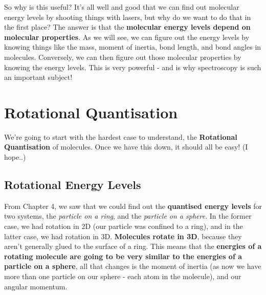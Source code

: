 \documentclass{memoir}[11pt,oneside,a4paper,openany]
\begin{document}
So why is this useful? It's all well and good that we can find out molecular energy levels by shooting things with lasers, but why do we want to do that in the first place? The answer is that the \textbf{molecular energy levels depend on molecular properties}. As we will see, we can figure out the energy levels by knowing things like the mass, moment of inertia, bond length, and bond angles in molecules. Conversely, we can then figure out those molecular properties by knowing the energy levels. This is very powerful - and is why spectroscopy is such an important subject! 

\section{Rotational Quantisation}
We're going to start with the hardest case to understand, the \textbf{Rotational Quantisation} of molecules. Once we have this down, it should all be easy! (I hope..)

\subsection{Rotational Energy Levels}
From Chapter 4, we saw that we could find out the \textbf{quantised energy levels} for two systems, the \emph{particle on a ring}, and the \emph{particle on a sphere}. In the former case, we had rotation in 2D (our particle was confined to a ring), and in the latter case, we had rotation in 3D. \textbf{Molecules rotate in 3D}, because they aren't generally glued to the surface of a ring. This means that the \textbf{energies of a rotating molecule are going to be very similar to the energies of a particle on a sphere}, all that changes is the moment of inertia (as now we have more than one particle on our sphere - each atom in the molecule), and our angular momentum. 
\end{document}
